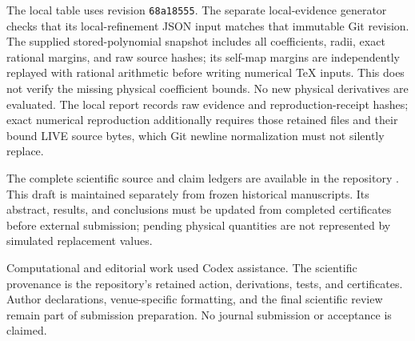 \documentclass[11pt]{article}
\begin{document}
The local table uses revision \texttt{68a18555}. The separate local-evidence
generator checks that its local-refinement JSON input matches that immutable
Git revision. The supplied stored-polynomial snapshot includes all
coefficients, radii, exact rational margins, and raw source hashes; its
self-map margins are independently replayed with rational arithmetic before
writing numerical TeX inputs. This does not verify the missing physical
coefficient bounds. No new physical derivatives are evaluated. The local
report records raw evidence and reproduction-receipt
hashes; exact numerical reproduction additionally requires those retained
files and their bound LIVE source bytes, which Git newline normalization
must not silently replace.

The complete scientific source and claim ledgers are available in the
repository \cite{repo}. This draft is maintained separately from frozen
historical manuscripts. Its abstract, results, and conclusions must be
updated from completed certificates before external submission; pending
physical quantities are not represented by simulated replacement values.

Computational and editorial work used Codex assistance. The scientific
provenance is the repository's retained action, derivations, tests, and
certificates. Author declarations, venue-specific formatting, and the final
scientific review remain part of submission preparation. No journal
submission or acceptance is claimed.
\end{document}
